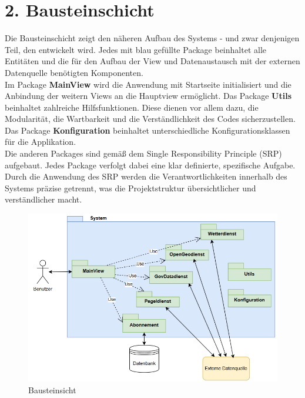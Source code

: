 \documentclass[a4paper,12pt]{scrreprt}
\begin{document}
\section*{\large \textbf{2. Bausteinschicht}}
Die Bausteinschicht zeigt den näheren Aufbau des Systems - und zwar denjenigen Teil, den entwickelt wird. Jedes mit blau gefüllte Package beinhaltet alle Entitäten und die für den Aufbau der View und Datenaustausch mit der externen Datenquelle benötigten Komponenten.\\
Im Package \textbf{MainView} wird die Anwendung mit Startseite initialisiert und die Anbindung der weitern Views an die Hauptview ermöglicht. Das Package \textbf{Utils} beinhaltet zahlreiche Hilfsfunktionen. Diese dienen vor allem dazu, die Modularität, die Wartbarkeit und die Verständlichkeit des Codes sicherzustellen. Das Package \textbf{Konfiguration} beinhaltet unterschiedliche Konfigurationsklassen für die Applikation.\\ Die anderen Packages sind gemäß dem Single Responsibility Principle (SRP) aufgebaut. Jedes Package verfolgt dabei eine klar definierte, spezifische Aufgabe. Durch die Anwendung des SRP werden die Verantwortlichkeiten innerhalb des Systems präzise getrennt, was die Projektstruktur übersichtlicher und verständlicher macht.
\begin{figure}[H]
	\centering
	\includegraphics[width=15cm]{Bausteinsicht-1.png}
	\caption{\label{} Bausteinsicht}
\end{figure}
\clearpage
\end{document}
